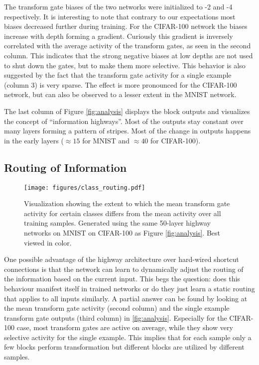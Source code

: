 \documentclass{article}
\begin{document}
The transform gate biases of the two networks were initialized to -2 and -4 respectively. 
It is interesting to note that contrary to our expectations most biases decreased further during training. 
For the CIFAR-100 network the biases increase with depth forming a gradient. 
Curiously this gradient is inversely correlated with the average activity of the transform gates, as seen in the second column.
This indicates that the strong negative biases at low depths are not used to shut down the gates, but to make them more selective. 
This behavior is also suggested by the fact that the transform gate activity for a single example (column 3) is very sparse. 
The effect is more pronounced for the CIFAR-100 network, but can also be observed to a lesser extent in the MNIST network.

The last column of Figure \ref{fig:analysis} displays the block outputs and visualizes the concept of ``information highways''.
Most of the outputs stay constant over many layers forming a pattern of stripes. 
Most of the change in outputs happens in the early layers ($\approx15$ for MNIST and $\approx40$ for CIFAR-100). 

\subsection{Routing of Information}
\begin{figure*}[t]
\texttt{[image: figures/class\_routing.pdf]}
\caption{Visualization showing the extent to which the mean transform gate activity for certain classes differs from the mean activity over all training samples. Generated using the same 50-layer highway networks on MNIST on CIFAR-100 as Figure \ref{fig:analysis}. Best viewed in color.}
\label{fig:classes}
\end{figure*}

One possible advantage of the highway architecture over hard-wired shortcut connections is that the network can learn to dynamically adjust the routing of the information based on the current input.
This begs the question: does this behaviour manifest itself in trained networks or do they just learn a static routing that applies to all inputs similarly.
A partial answer can be found by looking at the mean transform gate activity (second column) and the single example transform gate outputs (third column) in \autoref{fig:analysis}.
Especially for the CIFAR-100 case, most transform gates are active on average, while they show very selective activity for the single example.
This implies that for each sample only a few blocks perform transformation but different blocks are utilized by different samples.
\end{document}
